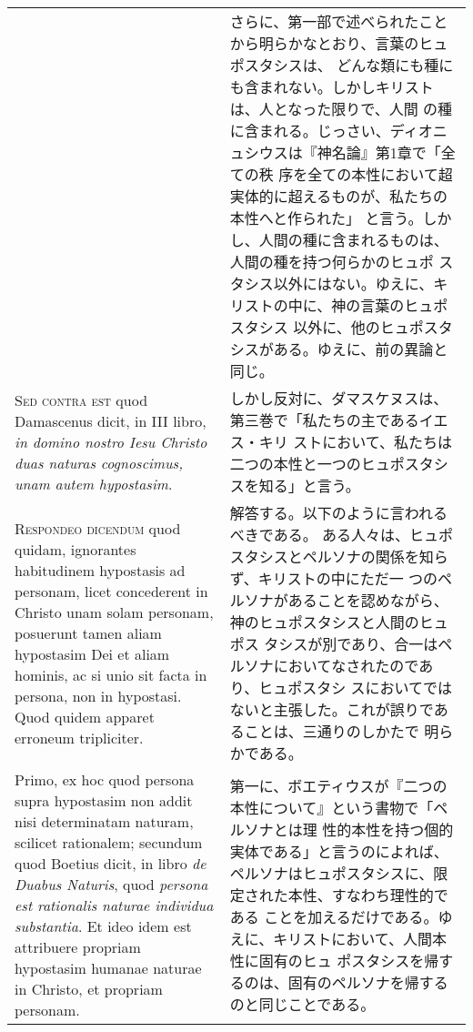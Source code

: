 \documentclass[10pt]{jsarticle} %
\begin{document}
\begin{longtable}{p{21em}p{21em}}
&

さらに、第一部で述べられたことから明らかなとおり、言葉のヒュポスタシスは、
 どんな類にも種にも含まれない。しかしキリストは、人となった限りで、人間
 の種に含まれる。じっさい、ディオニュシウスは『神名論』第1章で「全ての秩
 序を全ての本性において超実体的に超えるものが、私たちの本性へと作られた」
 と言う。しかし、人間の種に含まれるものは、人間の種を持つ何らかのヒュポ
 スタシス以外にはない。ゆえに、キリストの中に、神の言葉のヒュポスタシス
 以外に、他のヒュポスタシスがある。ゆえに、前の異論と同じ。

\\



{\scshape Sed contra est} quod Damascenus dicit, in III libro, {\itshape in domino nostro
Iesu Christo duas naturas cognoscimus, unam autem hypostasim}.

&

しかし反対に、ダマスケヌスは、第三巻で「私たちの主であるイエス・キリ
 ストにおいて、私たちは二つの本性と一つのヒュポスタシスを知る」と言う。

\\



{\scshape Respondeo dicendum} quod quidam, ignorantes habitudinem hypostasis ad
personam, licet concederent in Christo unam solam personam, posuerunt
tamen aliam hypostasim Dei et aliam hominis, ac si unio sit facta in
persona, non in hypostasi. Quod quidem apparet erroneum
tripliciter. 


&

解答する。以下のように言われるべきである。
ある人々は、ヒュポスタシスとペルソナの関係を知らず、キリストの中にただ一
 つのペルソナがあることを認めながら、神のヒュポスタシスと人間のヒュポス
 タシスが別であり、合一はペルソナにおいてなされたのであり、ヒュポスタシ
 スにおいてではないと主張した。これが誤りであることは、三通りのしかたで
 明らかである。


\\


Primo, ex hoc quod persona supra hypostasim non addit nisi
determinatam naturam, scilicet rationalem; secundum quod Boetius dicit,
in libro {\itshape de Duabus Naturis}, quod {\itshape persona est rationalis naturae
individua substantia}. 
Et ideo idem est attribuere propriam hypostasim
humanae naturae in Christo, et propriam personam.

&

第一に、ボエティウスが『二つの本性について』という書物で「ペルソナとは理
 性的本性を持つ個的実体である」と言うのによれば、ペルソナはヒュポスタシスに、限定された本性、すなわち理性的である
 ことを加えるだけである。ゆえに、キリストにおいて、人間本性に固有のヒュ
 ポスタシスを帰するのは、固有のペルソナを帰するのと同じことである。



\end{longtable}
\end{document}
